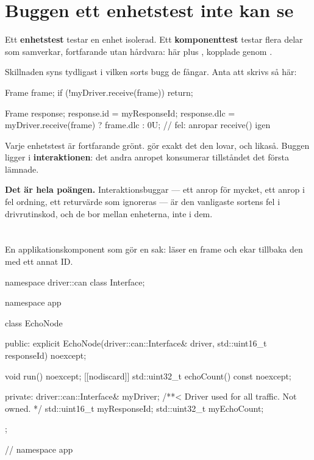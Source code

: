 \section{Buggen ett enhetstest inte kan se}
\label{sec:interaction}

Ett \textbf{enhetstest} testar en enhet isolerad. Ett \textbf{komponenttest} testar flera delar som
samverkar, fortfarande utan hårdvara: här  plus ,
kopplade genom .

Skillnaden syns tydligast i vilken sorts bugg de fångar. Anta att  skrivs så här:

\begin{cppcode}
Frame frame{};
if (!myDriver.receive(frame)) { return; }

Frame response{};
response.id  = myResponseId;
response.dlc = myDriver.receive(frame) ? frame.dlc : 0U;   // fel: anropar receive() igen
\end{cppcode}

Varje enhetstest är fortfarande grönt.  gör exakt det den lovar, och 
likaså. Buggen ligger i \textbf{interaktionen}: det andra anropet konsumerar tillståndet det första
lämnade.

\textbf{Det är hela poängen.} Interaktionsbuggar --- ett anrop för mycket, ett anrop i fel ordning,
ett returvärde som ignoreras --- är den vanligaste sortens fel i drivrutinskod, och de bor mellan
enheterna, inte i dem.

\section{\texorpdfstring{}{app::EchoNode}}
\label{sec:echonode}

En applikationskomponent som gör en sak: läser en frame och ekar tillbaka den med ett annat ID.

\begin{cppcode}
namespace driver::can { class Interface; }

namespace app
{
class EchoNode
{
public:
    explicit EchoNode(driver::can::Interface& driver, std::uint16_t responseId) noexcept;

    void run() noexcept;
    [[nodiscard]] std::uint32_t echoCount() const noexcept;

private:
    driver::can::Interface& myDriver; /**< Driver used for all traffic. Not owned. */
    std::uint16_t myResponseId;
    std::uint32_t myEchoCount;
};
} // namespace app
\end{cppcode}

